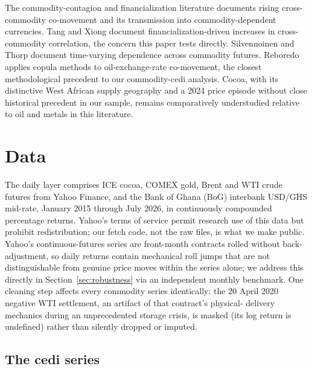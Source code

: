 \documentclass[final,3p,times,authoryear]{elsarticle}
\begin{document}
The commodity-contagion and financialization literature documents rising
cross-commodity co-movement and its transmission into commodity-dependent
currencies. Tang and Xiong \citep{tang2012} document
financialization-driven increases in cross-commodity correlation, the
concern this paper tests directly. Silvennoinen and Thorp
\citep{silvennoinen2013} document time-varying dependence across
commodity futures. Reboredo \citep{reboredo2012} applies copula methods
to oil-exchange-rate co-movement, the closest methodological precedent
to our commodity-cedi analysis. Cocoa, with its distinctive West African
supply geography and a 2024 price episode without close historical
precedent in our sample, remains comparatively understudied relative to
oil and metals in this literature.

\section{Data}
\label{sec:data}

The daily layer comprises ICE cocoa, COMEX gold, Brent and WTI crude
futures from Yahoo Finance, and the Bank of Ghana (BoG) interbank
USD/GHS mid-rate, January 2015 through July 2026, in continuously
compounded percentage returns. Yahoo's terms of service permit research
use of this data but prohibit redistribution; our fetch code, not the
raw files, is what we make public. Yahoo's continuous-futures series are
front-month contracts rolled without back-adjustment, so daily returns
contain mechanical roll jumps that are not distinguishable from genuine
price moves within the series alone; we address this directly in
Section~\ref{sec:robustness} via an independent monthly benchmark. One
cleaning step affects every commodity series identically: the 20 April
2020 negative WTI settlement, an artifact of that contract's physical-
delivery mechanics during an unprecedented storage crisis, is masked
(its log return is undefined) rather than silently dropped or imputed.

\subsection{The cedi series}
\label{sec:cedi-provenance}
\end{document}
